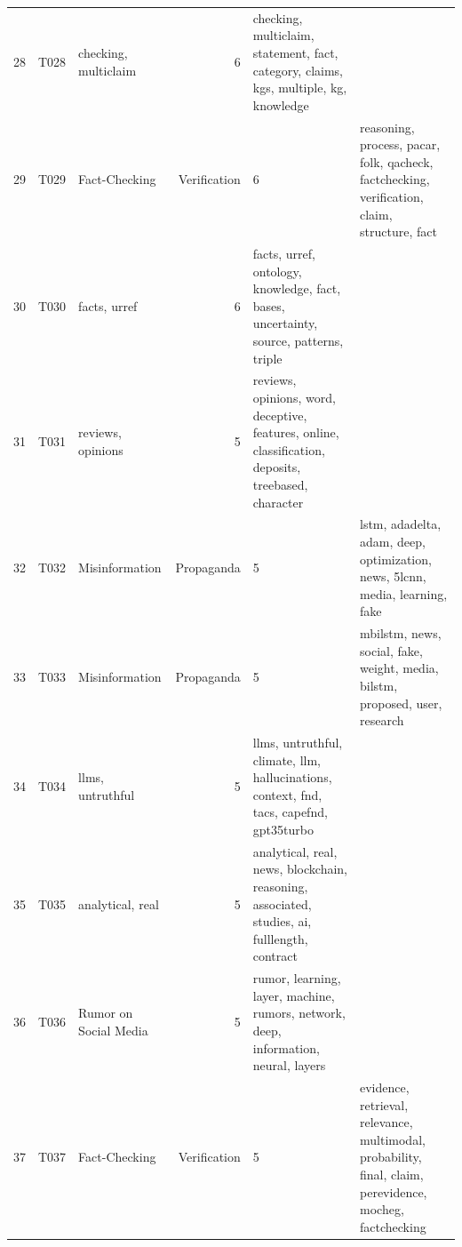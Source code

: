 \begin{tabular}{rllrl}
28 & T028 & checking, multiclaim & 6 & checking, multiclaim, statement, fact, category, claims, kgs, multiple, kg, knowledge \\
29 & T029 & Fact-Checking & Verification & 6 & reasoning, process, pacar, folk, qacheck, factchecking, verification, claim, structure, fact \\
30 & T030 & facts, urref & 6 & facts, urref, ontology, knowledge, fact, bases, uncertainty, source, patterns, triple \\
31 & T031 & reviews, opinions & 5 & reviews, opinions, word, deceptive, features, online, classification, deposits, treebased, character \\
32 & T032 & Misinformation & Propaganda & 5 & lstm, adadelta, adam, deep, optimization, news, 5lcnn, media, learning, fake \\
33 & T033 & Misinformation & Propaganda & 5 & mbilstm, news, social, fake, weight, media, bilstm, proposed, user, research \\
34 & T034 & llms, untruthful & 5 & llms, untruthful, climate, llm, hallucinations, context, fnd, tacs, capefnd, gpt35turbo \\
35 & T035 & analytical, real & 5 & analytical, real, news, blockchain, reasoning, associated, studies, ai, fulllength, contract \\
36 & T036 & Rumor on Social Media & 5 & rumor, learning, layer, machine, rumors, network, deep, information, neural, layers \\
37 & T037 & Fact-Checking & Verification & 5 & evidence, retrieval, relevance, multimodal, probability, final, claim, perevidence, mocheg, factchecking \\
\bottomrule
\end{tabular}
